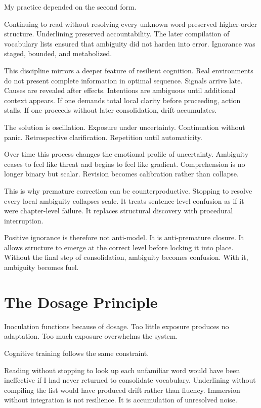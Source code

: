 \documentclass[12pt]{article}
\begin{document}
My practice depended on the second form.

Continuing to read without resolving every unknown word preserved higher-order structure. Underlining preserved accountability. The later compilation of vocabulary lists ensured that ambiguity did not harden into error. Ignorance was staged, bounded, and metabolized.

This discipline mirrors a deeper feature of resilient cognition. Real environments do not present complete information in optimal sequence. Signals arrive late. Causes are revealed after effects. Intentions are ambiguous until additional context appears. If one demands total local clarity before proceeding, action stalls. If one proceeds without later consolidation, drift accumulates.

The solution is oscillation. Exposure under uncertainty. Continuation without panic. Retrospective clarification. Repetition until automaticity.

Over time this process changes the emotional profile of uncertainty. Ambiguity ceases to feel like threat and begins to feel like gradient. Comprehension is no longer binary but scalar. Revision becomes calibration rather than collapse.

This is why premature correction can be counterproductive. Stopping to resolve every local ambiguity collapses scale. It treats sentence-level confusion as if it were chapter-level failure. It replaces structural discovery with procedural interruption.

Positive ignorance is therefore not anti-model. It is anti-premature closure. It allows structure to emerge at the correct level before locking it into place. Without the final step of consolidation, ambiguity becomes confusion. With it, ambiguity becomes fuel.

\section*{The Dosage Principle}

Inoculation functions because of dosage. Too little exposure produces no adaptation. Too much exposure overwhelms the system.

Cognitive training follows the same constraint.

Reading without stopping to look up each unfamiliar word would have been ineffective if I had never returned to consolidate vocabulary. Underlining without compiling the list would have produced drift rather than fluency. Immersion without integration is not resilience. It is accumulation of unresolved noise.
\end{document}

